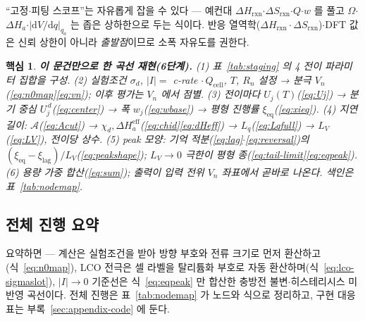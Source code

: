 \documentclass[11pt,a4paper]{article}
\newtheorem*{keybox}{핵심}
\newcommand{\dd}{\mathrm{d}}
\newcommand{\eff}{\mathrm{eff}}
\newcommand{\eq}{\mathrm{eq}}
\newcommand{\cell}{\mathrm{cell}}
\newcommand{\rxn}{\mathrm{rxn}}
\begin{document}
``고정$\cdot$피팅 스코프''는 자유롭게 잡을 수 있다 — 예컨대
$\Delta H_\rxn$$\cdot$$\Delta S_\rxn$$\cdot$$Q$$\cdot$$w$ 를 풀고 $\Omega$$\cdot$$\Delta H_a$$\cdot$$|\dd V/\dd q|_{q_a}$
는 좁은 상하한으로 두는 식이다. 반응 열역학($\Delta H_\rxn\cdot\Delta S_\rxn$)$\cdot$DFT 값은 신뢰 상한이 아니라
\emph{출발점}이므로 소폭 자유도를 권한다.

\begin{keybox}
\textbf{이 문건만으로 한 곡선 재현(6단계).}
(1) 표~\ref{tab:staging} 의 4 전이 파라미터 집합을 구성.
(2) 실험조건 $\sigma_d$, $|I|=$ c-rate$\,\cdot Q_\cell$, $T$, $R_n$ 설정 → 분극 $V_n$(\eqref{eq:n0map}\eqref{eq:vn}); 이후 평가는 $V_n$ 에서 점별.
(3) 전이마다 $U_j(T)$(\eqref{eq:Uj}) → 분기 중심 $U_j^{\,d}$(\eqref{eq:center}) → 폭 $w_j$(\eqref{eq:wbase}) → 평형 진행률 $\xi_\eq$(\eqref{eq:xieq}).
(4) 지연 길이: $\mathcal A$(\eqref{eq:Acut}) → $\chi_d,\Delta H_a^\eff$(\eqref{eq:chid}\eqref{eq:dHeff}) → $L_q$(\eqref{eq:Lqfull}) → $L_V$(\eqref{eq:LV}), 전이당 상수.
(5) peak 모양: 기억 적분(\eqref{eq:lag}$\cdot$\eqref{eq:reversal})의 $(\xi_\eq-\xi_\mathrm{lag})/L_V$(\eqref{eq:peakshape}); $L_V\to0$ 극한이 평형 종(\eqref{eq:tail-limit}\eqref{eq:eqpeak}).
(6) 용량 가중 합산(\eqref{eq:sum}); 출력이 입력 전위 $V_n$ 좌표에서 곧바로 나온다. 색인은 표~\ref{tab:nodemap}.
\end{keybox}

\subsection{전체 진행 요약}\label{sec:facade}
요약하면 — 계산은 실험조건을 받아 방향 부호와 전류 크기로 먼저 환산하고(식~\eqref{eq:n0map}),
LCO 전극은 셀 라벨을 탈리튬화 부호로 자동 환산하며(식~\eqref{eq:lco-sigmaslot}), $|I|\to0$ 기준선은
식~\eqref{eq:eqpeak} 만 합산한 충방전 불변$\cdot$히스테리시스 미반영 곡선이다. 전체 진행은
표~\ref{tab:nodemap} 가 노드와 식으로 정리하고, 구현 대응표는
부록~\ref{sec:appendix-code} 에 둔다.
\end{document}
